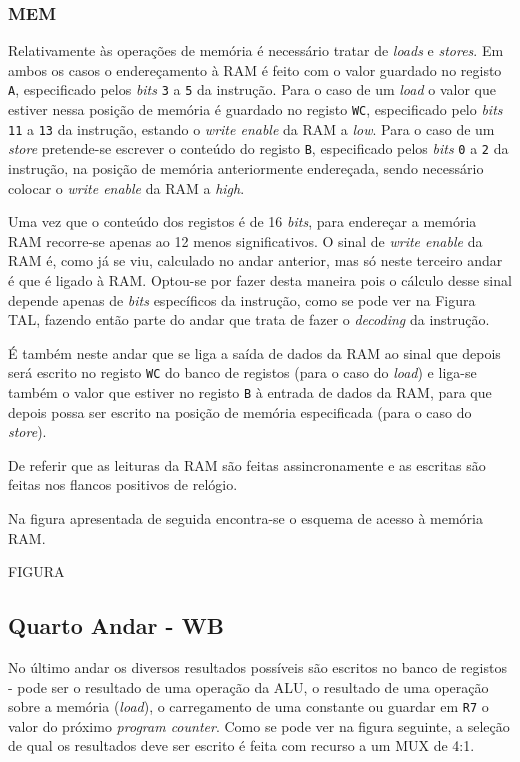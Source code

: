 \documentclass[11pt]{article}
\numberwithin{equation}{section}
\begin{document}
\subsubsection{MEM}

Relativamente às operações de memória é necessário tratar de \textit{loads} e \textit{stores}. Em ambos os casos o endereçamento à RAM é feito com o valor guardado no registo \texttt{A}, especificado pelos \textit{bits} \texttt{3} a \texttt{5} da instrução. Para o caso de um \textit{load} o valor que estiver nessa posição de memória é guardado no registo \texttt{WC}, especificado pelo \textit{bits} \texttt{11} a \texttt{13} da instrução, estando o \textit{write enable} da RAM a \textit{low}. Para o caso de um \textit{store} pretende-se escrever o conteúdo do registo \texttt{B}, especificado pelos \textit{bits} \texttt{0} a \texttt{2} da instrução, na posição de memória anteriormente endereçada, sendo necessário colocar o \textit{write enable} da RAM a \textit{high}. 

Uma vez que o conteúdo dos registos é de 16 \textit{bits}, para endereçar a memória RAM recorre-se apenas ao 12 menos significativos. O sinal de \textit{write enable} da RAM é, como já se viu, calculado no andar anterior, mas só neste terceiro andar é que é ligado à RAM. Optou-se por fazer desta maneira pois o cálculo desse sinal depende apenas de \textit{bits} específicos da instrução, como se pode ver na Figura TAL, fazendo então parte do andar que trata de fazer o \textit{decoding} da instrução.

É também neste andar que se liga a saída de dados da RAM ao sinal que depois será escrito no registo \texttt{WC} do banco de registos (para o caso do \textit{load}) e liga-se também o valor que estiver no registo \texttt{B} à entrada de dados da RAM, para que depois possa ser escrito na posição de memória especificada (para o caso do \textit{store}).

De referir que as leituras da RAM são feitas assincronamente e as escritas são feitas nos flancos positivos de relógio. 

Na figura apresentada de seguida encontra-se o esquema de acesso à memória RAM.

FIGURA

\subsection{Quarto Andar - WB}

No último andar os diversos resultados possíveis são escritos no banco de registos - pode ser o resultado de uma operação da ALU, o resultado de uma operação sobre a memória (\textit{load}), o carregamento de uma constante ou guardar em \texttt{R7} o valor do próximo \textit{program counter}. Como se pode ver na figura seguinte, a seleção de qual os resultados deve ser escrito é feita com recurso a um MUX de 4:1. 
\end{document}
